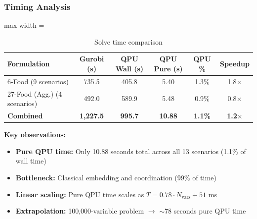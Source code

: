 
\subsubsection{Timing Analysis}

\begin{table}[H]
\centering
\caption{Solve time comparison}
\label{tab:timing_comparison}
\small
\begin{adjustbox}{max width = \textwidth}
\begin{tabular}{lccccc}
\toprule
\textbf{Formulation} & \textbf{Gurobi (s)} & \textbf{QPU Wall (s)} & \textbf{QPU Pure (s)} & \textbf{QPU \%} & \textbf{Speedup} \\
\midrule
6-Food (9 scenarios) & 735.5 & 405.8 & 5.40 & 1.3\% & 1.8$\times$ \\
27-Food (Agg.) (4 scenarios) & 492.0 & 589.9 & 5.48 & 0.9\% & 0.8$\times$ \\
\midrule
\textbf{Combined} & \textbf{1,227.5} & \textbf{995.7} & \textbf{10.88} & \textbf{1.1\%} & \textbf{1.2$\times$} \\
\bottomrule
\end{tabular}
\end{adjustbox}
\end{table}

\textbf{Key observations:}
\begin{itemize}
    \item \textbf{Pure QPU time:} Only 10.88 seconds total across all 13 scenarios (1.1\% of wall time)
    \item \textbf{Bottleneck:} Classical embedding and coordination (99\% of time)
    \item \textbf{Linear scaling:} Pure QPU time scales as $T = 0.78 \cdot N_{\text{vars}} + 51$ ms
    \item \textbf{Extrapolation:} 100,000-variable problem $\rightarrow$ $\sim$78 seconds pure QPU time
\end{itemize}

